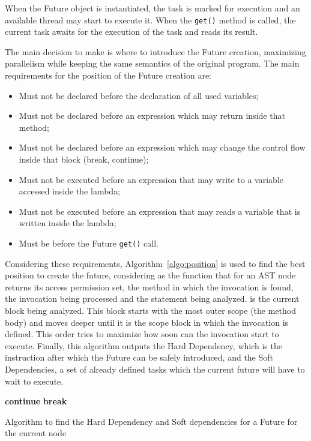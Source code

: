 \documentclass[smallextended]{svjour3}
\begin{document}
When the Future object is instantiated, the task is marked for execution and an available thread may start to execute it. When the \verb|get()| method is called, the current task awaits for the execution of the task and reads its result.

The main decision to make is where to introduce the Future creation, maximizing parallelism while keeping the same semantics of the original program. The main requirements for the position of the Future creation are:

\begin{itemize}
    \item Must not be declared before the declaration of all used variables;
    \item Must not be declared before an expression which may return inside that method;
    \item Must not be declared before an expression which may change the control flow inside that block (break, continue);
    \item Must not be executed before an expression that may write to a variable accessed inside the lambda;
    \item Must not be executed before an expression that may reads a variable that is written inside the lambda;
    \item Must be before the Future \verb|get()| call.
\end{itemize}

Considering these requirements, Algorithm~\ref{algo:position} is used to find the best position to create the future, considering  as the function that for an AST node returns its access permission set,  the method in which the invocation is found,  the invocation being processed and  the statement being analyzed.  is the current block being analyzed. This block starts with the most outer scope (the method body) and moves deeper until it is the scope block in which the invocation is defined. This order tries to maximize how soon can the invocation start to execute. Finally, this algorithm outputs the Hard Dependency, which is the instruction after which the Future can be safely introduced, and the Soft Dependencies, a set of already defined tasks which the current future will have to wait to execute.


\begin{algorithm}
\begin{algorithmic}
\State 
\State 
\For {}
    \If {}
        \State 
        \State \textbf{continue}
    \EndIf
    \If {}
        \If {}
            \State 
        \Else
            \State 
        \EndIf
    \EndIf
    \If {}
        \State \textbf{break}
    \EndIf
\EndFor
\label{algo:position}
\caption{Algorithm to find the Hard Dependency and Soft dependencies for a Future for the current node}
\end{algorithmic}
\end{algorithm}
\end{document}
